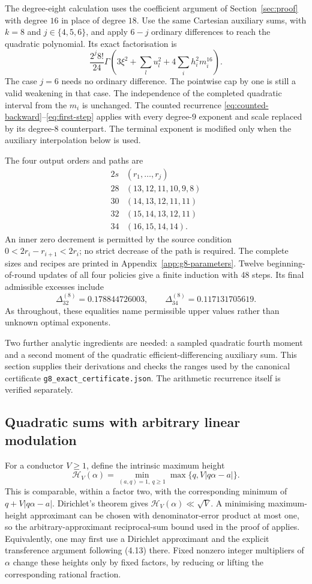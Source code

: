 \documentclass[11pt,letterpaper]{article}
\numberwithin{equation}{section}
\begin{document}
The degree-eight calculation uses the coefficient argument of
Section~\ref{sec:proof} with degree $16$ in place of degree $18$.
Use the same Cartesian auxiliary sums, with $k=8$ and
$j\in\{4,5,6\}$, and apply $6-j$ ordinary differences to reach the
quadratic polynomial. Its exact factorisation is
\[
 \frac{2^j8!}{24}\Gamma
       \left(3\xi^2+\sum_lu_l^2+4\sum_i h_i^2m_i^{16}\right).
\]
The case $j=6$ needs no ordinary difference. The pointwise cap by one is
still a valid weakening in that case. The independence of the completed
quadratic interval from the $m_i$ is unchanged. The counted recurrence
\eqref{eq:counted-backward}--\eqref{eq:first-step} applies with every
degree-$9$ exponent and scale replaced by its degree-$8$ counterpart.
The terminal exponent is modified only when the auxiliary interpolation
below is used.

The four output orders and paths are
\[
\begin{array}{cl}
2s&(r_1,\ldots,r_j)\\\hline
28&(13,12,11,10,9,8)\\
30&(14,13,12,11,11)\\
32&(15,14,13,12,11)\\
34&(16,15,14,14).
\end{array}
\]
An inner zero decrement is permitted by the source condition
$0<2r_i-r_{i+1}<2r_i$; no strict decrease of the path is required.
The complete sizes and recipes are printed in
Appendix~\ref{app:g8-parameters}. Twelve beginning-of-round updates of
all four policies give a finite induction with 48 steps. Its final
admissible excesses include
\[
 \Delta_{32}^{(8)}=0.178844726003,\qquad
 \Delta_{34}^{(8)}=0.117131705619.
\]
As throughout, these equalities name permissible upper values rather than
unknown optimal exponents.

Two further analytic ingredients are
needed: a sampled quadratic fourth moment and a second moment of the
quadratic efficient-differencing auxiliary sum. This section supplies their
derivations and checks the ranges used by the canonical certificate
\texttt{g8\_exact\_certificate.json}. The arithmetic recurrence itself is
verified separately.

\subsection{Quadratic sums with arbitrary linear modulation}

For a conductor $V\ge1$, define the intrinsic maximum height
\[
 \mathcal H_V(\alpha)=
 \min_{(a,q)=1,\ q\ge1}\max\{q,V|q\alpha-a|\}.
\]
This is comparable, within a factor two, with the corresponding minimum of
$q+V|q\alpha-a|$. Dirichlet's theorem gives
$\mathcal H_V(\alpha)\ll\sqrt V$. A minimising maximum-height
approximant can be chosen with denominator-error product at most one, so the
arbitrary-approximant reciprocal-sum bound used in the proof of
\cite[Lemma~4.4]{VW95} applies. Equivalently, one may first use a Dirichlet
approximant and the explicit transference argument following (4.13) there.
Fixed nonzero integer multipliers of $\alpha$ change these heights only by
fixed factors, by reducing or lifting the corresponding rational fraction.
\end{document}
